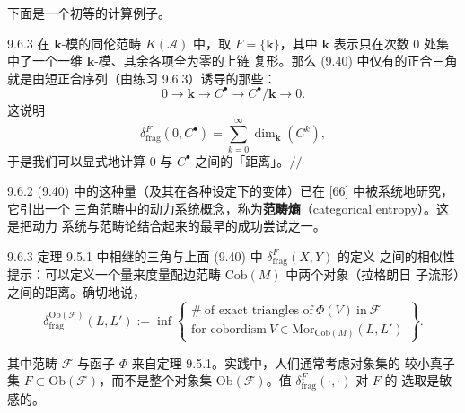 下面是一个初等的计算例子。

\begin{wexam}{9.6.3}
在 $\mathbf k$-模的同伦范畴 $K(\mathcal A)$ 中，取 $F=\{\mathbf k\}$，其中
$\mathbf k$ 表示只在次数 $0$ 处集中了一个一维 $\mathbf k$-模、其余各项全为零的上链
复形。那么 (9.40) 中仅有的正合三角就是由短正合序列（由练习 9.6.3）诱导的那些：
\[
0\to\mathbf k\to C^\bullet\to C^\bullet/\mathbf k\to0.
\]
这说明
\[
\delta^{F}_{\mathrm{frag}}(0,C^\bullet)
=\sum_{k=0}^{\infty}\dim_{\mathbf k}(C^k),
\]
于是我们可以显式地计算 $0$ 与 $C^\bullet$ 之间的「距离」。\hfill$//$
\end{wexam}


\begin{wrem}{9.6.2}
(9.40) 中的这种量（及其在各种设定下的变体）已在 [66] 中被系统地研究，它引出一个
三角范畴中的动力系统概念，称为\textbf{范畴熵}（categorical entropy）。这是把动力
系统与范畴论结合起来的最早的成功尝试之一。
\end{wrem}

\begin{wrem}{9.6.3}
定理 9.5.1 中相继的三角与上面 (9.40) 中 $\delta^{F}_{\mathrm{frag}}(X,Y)$ 的定义
之间的相似性提示：可以定义一个量来度量配边范畴 $\mathrm{Cob}(M)$ 中两个对象（拉格朗日
子流形）之间的距离。确切地说，
\begin{equation}\tag{9.41}
\delta^{\mathrm{Ob}(\mathcal F)}_{\mathrm{frag}}(L,L')
:=\inf\left\{
\begin{array}{l}
\#\ \text{of exact triangles of}\ \Phi(V)\ \text{in}\ \mathcal F\\
\text{for cobordism}\ V\in\mathrm{Mor}_{\mathrm{Cob}(M)}(L,L')
\end{array}\right\}.
\end{equation}
\end{wrem}

其中范畴 $\mathcal F$ 与函子 $\Phi$ 来自定理 9.5.1。实践中，人们通常考虑对象集的
较小真子集 $F\subset\mathrm{Ob}(\mathcal F)$，而不是整个对象集
$\mathrm{Ob}(\mathcal F)$。值 $\delta^{F}_{\mathrm{frag}}(\cdot,\cdot)$ 对 $F$ 的
选取是敏感的。

